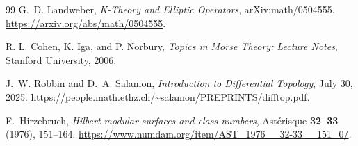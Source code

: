 \documentclass[11pt]{article}
\theoremstyle{definition}
\theoremstyle{plain}
\numberwithin{equation}{section}
\begin{document}
\begin{thebibliography}{99}
G.~D. Landweber,
\emph{K-Theory and Elliptic Operators},
arXiv:math/0504555.
\url{https://arxiv.org/abs/math/0504555}.

R. L. Cohen, K. Iga, and P. Norbury,
\textit{Topics in Morse Theory: Lecture Notes},
Stanford University, 2006.

J.~W. Robbin and D.~A. Salamon,
\emph{Introduction to Differential Topology},
July 30, 2025.
\url{https://people.math.ethz.ch/~salamon/PREPRINTS/difftop.pdf}.

F.~Hirzebruch,
\emph{Hilbert modular surfaces and class numbers},
Ast\'erisque \textbf{32--33} (1976), 151--164.
\url{https://www.numdam.org/item/AST_1976__32-33__151_0/}.
\end{thebibliography}
\end{document}
